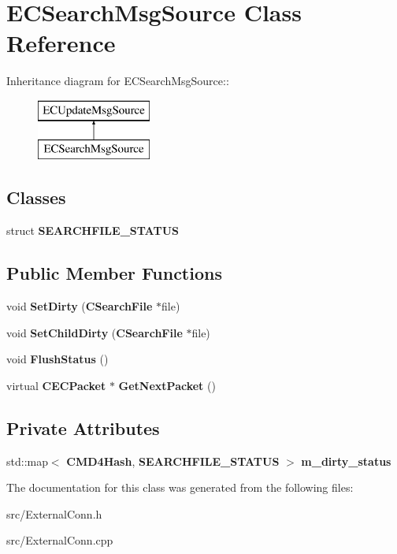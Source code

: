 \section{ECSearchMsgSource Class Reference}
\label{classECSearchMsgSource}
Inheritance diagram for ECSearchMsgSource::\begin{figure}[H]
\begin{center}
\leavevmode
\includegraphics[height=2cm]{classECSearchMsgSource}
\end{center}
\end{figure}
\subsection*{Classes}
\begin{DoxyCompactItemize}
\item 
struct {\bf SEARCHFILE\_\-STATUS}
\end{DoxyCompactItemize}
\subsection*{Public Member Functions}
\begin{DoxyCompactItemize}
\item 
void {\bfseries SetDirty} ({\bf CSearchFile} $\ast$file)\label{classECSearchMsgSource_a7b9c12aad7749cf79735a291a1aeb5a8}

\item 
void {\bfseries SetChildDirty} ({\bf CSearchFile} $\ast$file)\label{classECSearchMsgSource_a3497ba1450ae3a66f6b635a91e8fe680}

\item 
void {\bfseries FlushStatus} ()\label{classECSearchMsgSource_a7901f26d6a22a13d2f929b3e81fa61ff}

\item 
virtual {\bf CECPacket} $\ast$ {\bfseries GetNextPacket} ()\label{classECSearchMsgSource_a2e1ef95830f5f5db02a1f3d7416bafd7}

\end{DoxyCompactItemize}
\subsection*{Private Attributes}
\begin{DoxyCompactItemize}
\item 
std::map$<$ {\bf CMD4Hash}, {\bf SEARCHFILE\_\-STATUS} $>$ {\bfseries m\_\-dirty\_\-status}\label{classECSearchMsgSource_a0dab99e7701c2c9447cd8befe9879c01}

\end{DoxyCompactItemize}


The documentation for this class was generated from the following files:\begin{DoxyCompactItemize}
\item 
src/ExternalConn.h\item 
src/ExternalConn.cpp\end{DoxyCompactItemize}
